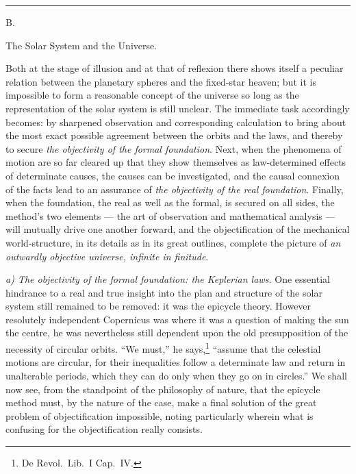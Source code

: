 \documentclass[12pt,a4paper]{book}
\newcommand{\afdeling}[2]{%
  \par\vspace{1.3\baselineskip}%
  {\centering #1\par\vspace{0.2\baselineskip}\normalsize #2\par}%
  \addcontentsline{toc}{section}{#1 #2}%
  \vspace{0.8\baselineskip}\par\nointerlineskip}
\newcommand{\streg}{\begin{center}\rule{2cm}{0.4pt}\end{center}}
\newcommand{\runin}[1]{\emph{#1}\hspace{0.4em}}
\begin{document}
\streg

\afdeling{B.}{The Solar System and the Universe.}

Both at the stage of illusion and at that of reflexion there shows itself a peculiar relation between
the planetary spheres and the fixed-star heaven; but it is impossible to form a reasonable concept of
the universe so long as the representation of the solar system is still unclear. The immediate task
accordingly becomes: by sharpened observation and corresponding calculation to bring about the most
exact possible agreement between the orbits and the laws, and thereby to secure \emph{the objectivity
of the formal foundation}. Next, when the phenomena of motion are so far cleared up that they show
themselves as law-determined effects of determinate causes, the causes can be investigated, and the
causal connexion of the facts lead to an assurance of \emph{the objectivity of the real foundation}.
Finally, when the foundation, the real as well as the formal, is secured on all sides, the method's two
elements --- the art of observation and mathematical analysis --- will mutually drive one another
forward, and the objectification of the mechanical world-structure, in its details as in its great
outlines, complete the picture of \emph{an outwardly objective universe, infinite in finitude}.

\runin{a) The objectivity of the formal foundation: the Keplerian laws.} One essential hindrance to a
real and true insight into the plan and structure of the solar system still remained to be removed: it
was the epicycle theory. However resolutely independent Copernicus was where it was a question of
making the sun the centre, he was nevertheless still dependent upon the old presupposition of the
necessity of circular orbits. ``We must,'' he says,\footnote{%
De Revol.\ Lib.\ I Cap.\ IV.} ``assume that the celestial
motions are circular, for their inequalities follow a determinate law and return in unalterable periods,
which they can do only when they go on in circles.'' We shall now see, from the standpoint of the
philosophy of nature, that the epicycle method must, by the nature of the case, make a final solution of
the great problem of objectification impossible, noting particularly wherein what is confusing for the
objectification really consists.
\end{document}
